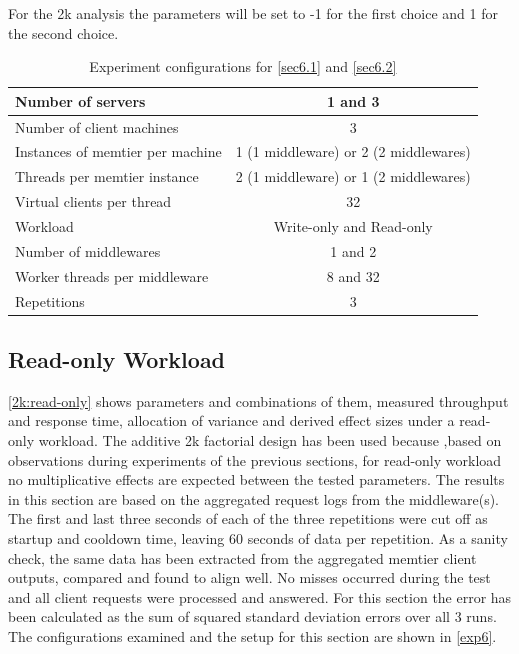\documentclass[11pt,a4paper]{article}
\begin{document}
For the 2k analysis the parameters will be set to -1 for the first choice and 1 for the second choice.


\begin{table}[H]
    \centering
		\begin{tabular}{|l|c|}
			\hline Number of servers                & 1 and 3                                     \\ 
			\hline Number of client machines        & 3                                           \\ 
			\hline Instances of memtier per machine & 1 (1 middleware) or 2 (2 middlewares)       \\ 
			\hline Threads per memtier instance     & 2 (1 middleware) or 1 (2 middlewares)       \\
			\hline Virtual clients per thread       & 32                                          \\ 
			\hline Workload                         & Write-only and Read-only                    \\
			\hline Number of middlewares            & 1 and 2                                     \\
			\hline Worker threads per middleware    & 8 and 32                                    \\
			\hline Repetitions                      & 3                                   \\ 
			\hline 
		\end{tabular}
		\caption{Experiment configurations for \autoref{sec6.1} and \autoref{sec6.2}}
		\label{exp6}
\end{table}

\subsection{Read-only Workload}\label{sec6.1}

\autoref{2k:read-only} shows parameters and combinations of them, measured throughput and response time, allocation of variance and derived effect sizes under a read-only workload. The additive 2k factorial design has been used because ,based on observations during experiments of the previous sections, for read-only workload no multiplicative effects are expected between the tested parameters.
The results in this section are based on the aggregated request logs from the middleware(s). The first and last three seconds of each of the three repetitions were cut off as startup and cooldown time, leaving 60 seconds of data per repetition. As a sanity check, the same data has been extracted from the aggregated memtier client outputs, compared and found to align well. No misses occurred during the test and all client requests were processed and answered. For this section the error has been calculated as the sum of squared standard deviation errors over all 3 runs. The configurations examined and the setup for this section are shown in \autoref{exp6}.
\end{document}
